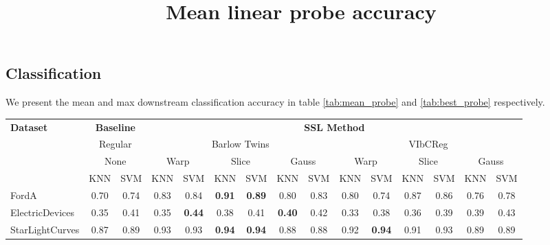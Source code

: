 \documentclass[../../thesis.tex]{subfiles}
\begin{document}
\subsection{Classification}

We present the mean and max downstream classification accuracy in table \ref{tab:mean_probe} and \ref{tab:best_probe} respectively. 


\begin{table}[h]
    \centering
    \title{Mean linear probe accuracy}
    \begin{adjustbox}{width=\textwidth}
    \begin{tabular}{lcc|cc|cc|cc|cc|cc|cc} %
        \toprule
        \multirow{4}{*}{\textbf{Dataset}} & \multicolumn{2}{c}{\textbf{Baseline}} & \multicolumn{12}{c}{\textbf{SSL Method}} \\
                                            \cmidrule(lr){2-3} \cmidrule(lr){4-15}
                                          & \multicolumn{2}{c}{Regular}           & \multicolumn{6}{c}{Barlow Twins}                                                 &  \multicolumn{6}{c}{VIbCReg} \\
                                          \cmidrule(lr){2-3} \cmidrule(lr){4-9} \cmidrule(lr){10-15}
                                          &   \multicolumn{2}{c}{None}            & \multicolumn{2}{c}{Warp}  & \multicolumn{2}{c}{Slice} & \multicolumn{2}{c}{Gauss} & \multicolumn{2}{c}{Warp} & \multicolumn{2}{c}{Slice} & \multicolumn{2}{c}{Gauss} \\
                                          \cmidrule(lr){2-3} \cmidrule(lr){4-5} \cmidrule(lr){6-7} \cmidrule(lr){8-9} \cmidrule(lr){10-11} \cmidrule(lr){12-13}\cmidrule(lr){14-15}
                                          & KNN & SVM                               & KNN & SVM                  & KNN & SVM                & KNN & SVM                 & KNN & SVM                 & KNN & SVM                 & KNN & SVM   \\
        \midrule
        FordA                   & 0.70 & 0.74 & 0.83 & 0.84 & \textbf{0.91} & \textbf{0.89} & 0.80 & 0.83 & 0.80 & 0.74 & 0.87 & 0.86 & 0.76 & 0.78 \\
        ElectricDevices         & 0.35 & 0.41 & 0.35 & \textbf{0.44} & 0.38 & 0.41 & \textbf{0.40} & 0.42 & 0.33 & 0.38 & 0.36 & 0.39 & 0.39 & 0.43 \\
        StarLightCurves         & 0.87 & 0.89 & 0.93 & 0.93 & \textbf{0.94} & \textbf{0.94} & 0.88 & 0.88 & 0.92 & \textbf{0.94} & 0.91 & 0.93 & 0.89 & 0.89 \\

\end{tabular}
\end{adjustbox}
\end{table}
\end{document}
